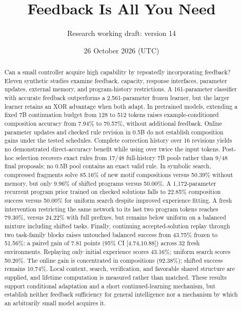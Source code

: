 \documentclass[11pt]{article}
\title{Feedback Is All You Need}
\author{Research working draft: version 14}
\date{26 October 2026 (UTC)}
\begin{document}
\maketitle
\begin{abstract}
Can a small controller acquire high capability by repeatedly incorporating
feedback? Eleven synthetic studies examine feedback, capacity, response
interfaces, parameter updates, external memory, and program-history restrictions.
A 161-parameter classifier with accurate feedback outperforms a 2,561-parameter
frozen learner, but the larger learner retains an XOR advantage when both
adapt. In pretrained models, extending a fixed 7B continuation budget from
128 to 512 tokens raises example-conditioned composition accuracy from
7.94\% to 70.57\%, without additional feedback. Online parameter updates and
checked rule revision in 0.5B do not establish composition gains under the
tested schedules. Complete correction history over 16 revisions yields no
demonstrated direct-accuracy benefit while using over twice the input tokens.
Post-hoc selection recovers exact rules from 17/48 full-history 7B pools
rather than 9/48 final proposals; no 0.5B pool contains an exact valid rule.
In symbolic search, compressed fragments solve 85.16\% of new motif
compositions versus 50.39\% without memory, but only 9.96\% of shifted
programs versus 50.00\%. A 1,172-parameter recurrent program prior trained on
checked solutions falls to 22.85\% composition success versus 50.00\% for
uniform search despite improved experience fitting. A fresh intervention
restricting the same network to its last two program tokens reaches 79.30\%,
versus 24.22\% with full prefixes, but remains below uniform on a balanced
mixture including shifted tasks. Finally, continuing accepted-solution replay
through two task-family blocks raises untouched balanced success from 43.75\%
frozen to 51.56\%: a paired gain of 7.81 points (95\% CI [4.74,10.88]) across
32 fresh environments. Replaying only initial experience scores 43.16\%;
uniform search scores 50.20\%. The online gain is concentrated in compositions
(92.38\%); shifted success remains 10.74\%. Local context, search, verification,
and favorable shared structure are supplied, and lifetime computation is
measured rather than matched. These results support conditional adaptation
and a short continued-learning mechanism, but establish neither feedback
sufficiency for general intelligence nor a mechanism by which an arbitrarily
small model acquires it.
\end{abstract}
\end{document}
